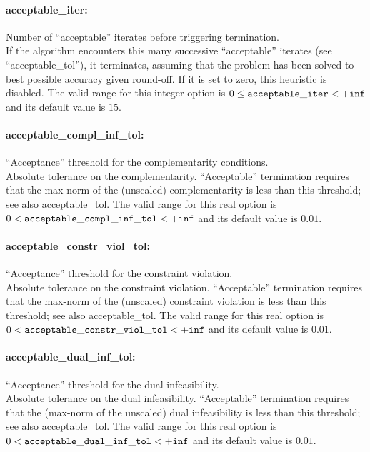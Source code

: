 \paragraph{acceptable\_iter:} Number of ``acceptable'' iterates before triggering termination. $\;$ \\
If the algorithm encounters this many successive ``acceptable'' iterates (see ``acceptable\_tol''), it terminates, assuming that the problem has been solved to best possible accuracy given round-off.
If it is set to zero, this heuristic is disabled.
The valid range for this integer option is
$0 \le {\tt acceptable\_iter } <  {\tt +inf}$
and its default value is $15$.

\paragraph{acceptable\_compl\_inf\_tol:} ``Acceptance'' threshold for the complementarity conditions. $\;$ \\
 Absolute tolerance on the complementarity.
``Acceptable'' termination requires that the
max-norm of the (unscaled) complementarity is
less than this threshold; see also
acceptable\_tol. The valid range for this real option is 
$0 <  {\tt acceptable\_compl\_inf\_tol } <  {\tt +inf}$
and its default value is $0.01$.


\paragraph{acceptable\_constr\_viol\_tol:} ``Acceptance'' threshold for the constraint violation. $\;$ \\
 Absolute tolerance on the constraint violation.
``Acceptable'' termination requires that the
max-norm of the (unscaled) constraint violation
is less than this threshold; see also
acceptable\_tol. The valid range for this real option is 
$0 <  {\tt acceptable\_constr\_viol\_tol } <  {\tt +inf}$
and its default value is $0.01$.


\paragraph{acceptable\_dual\_inf\_tol:} ``Acceptance'' threshold for the dual infeasibility. $\;$ \\
 Absolute tolerance on the dual infeasibility.
``Acceptable'' termination requires that the
(max-norm of the unscaled) dual infeasibility is
less than this threshold; see also
acceptable\_tol. The valid range for this real option is 
$0 <  {\tt acceptable\_dual\_inf\_tol } <  {\tt +inf}$
and its default value is $0.01$.


